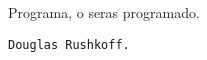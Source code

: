 \chapter*{}
\begin{flushright}
Programa, o seras programado.

\texttt{Douglas Rushkoff.}


\end{flushright}
